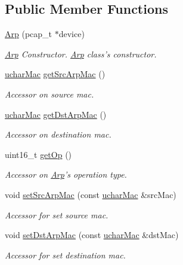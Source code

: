 \subsection*{Public Member Functions}
\begin{DoxyCompactItemize}
\item 
\hyperlink{class_arp_a1af9d2c89cc67c74e8621b47f33ae773}{Arp} (pcap\-\_\-t $\ast$device)
\begin{DoxyCompactList}\small\item\em \hyperlink{class_arp}{Arp} Constructor. \hyperlink{class_arp}{Arp} class's constructor. \end{DoxyCompactList}\item 
\hyperlink{structuchar_mac}{uchar\-Mac} \hyperlink{class_arp_adc3ecc7bcb032b6a352ac9867ae75766}{get\-Src\-Arp\-Mac} ()
\begin{DoxyCompactList}\small\item\em Accessor on source mac. \end{DoxyCompactList}\item 
\hyperlink{structuchar_mac}{uchar\-Mac} \hyperlink{class_arp_aaa4f036bf6ad3a85cced8ddc66872c09}{get\-Dst\-Arp\-Mac} ()
\begin{DoxyCompactList}\small\item\em Accessor on destination mac. \end{DoxyCompactList}\item 
uint16\-\_\-t \hyperlink{class_arp_ae8ab693dbb641210a70aa4d8ee76a722}{get\-Op} ()
\begin{DoxyCompactList}\small\item\em Accessor on \hyperlink{class_arp}{Arp}'s operation type. \end{DoxyCompactList}\item 
void \hyperlink{class_arp_af3bf7936c6fc4312175cad8ab1e88757}{set\-Src\-Arp\-Mac} (const \hyperlink{structuchar_mac}{uchar\-Mac} \&src\-Mac)
\begin{DoxyCompactList}\small\item\em Accessor for set source mac. \end{DoxyCompactList}\item 
void \hyperlink{class_arp_adfe61fa40b101e43e4785ea74a6cf291}{set\-Dst\-Arp\-Mac} (const \hyperlink{structuchar_mac}{uchar\-Mac} \&dst\-Mac)
\begin{DoxyCompactList}\small\item\em Accessor for set destination mac. \end{DoxyCompactList}\item 

\end{DoxyCompactItemize}
